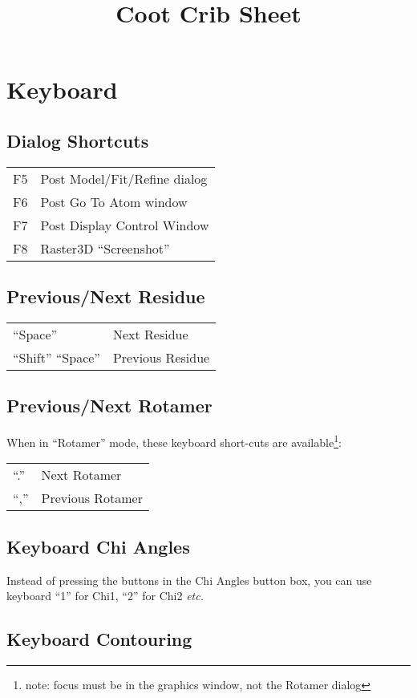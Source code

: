 \documentclass[twocolumn]{article}
\title{Coot Crib Sheet}
\begin{document}
\maketitle

\section{Keyboard}

\subsection{Dialog Shortcuts}
\begin{tabular}{ll}
  F5  & Post Model/Fit/Refine dialog \\
  F6  & Post Go To Atom window \\
  F7  & Post Display Control Window\\
  F8 & Raster3D ``Screenshot''
\end{tabular}


\subsection{Previous/Next Residue}

\begin{tabular}{ll}
  ``Space'' & Next Residue \\
  ``Shift'' ``Space'' & Previous Residue
\end{tabular}

\subsection{Previous/Next Rotamer}

When in ``Rotamer'' mode, these keyboard short-cuts are
available\footnote{note: focus must be in the graphics window, not
  the Rotamer dialog}:

\begin{tabular}{ll}
  ``.'' & Next Rotamer \\
  ``,'' & Previous Rotamer
\end{tabular}

\subsection{Keyboard Chi Angles}
Instead of pressing the buttons in the Chi Angles button box, you can
use keyboard ``1'' for Chi1, ``2'' for Chi2 \emph{etc.}

\subsection{Keyboard Contouring}
\end{document}

